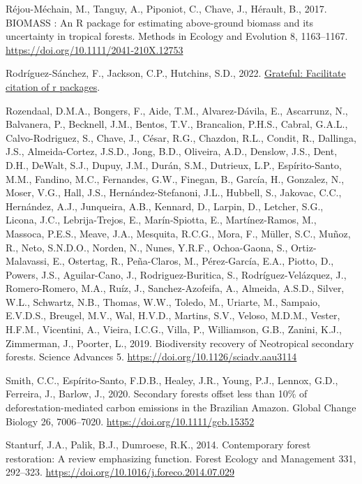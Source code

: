 \documentclass[
  12pt,
]{article}
\newlength{\cslhangindent}
\newlength{\cslentryspacingunit} %
\newenvironment{CSLReferences}[2] %
 {%
  \setlength{\parindent}{0pt}
  \ifodd #1
  \let\oldpar\par
  \def\par{\hangindent=\cslhangindent\oldpar}
  \fi
  \setlength{\parskip}{#2\cslentryspacingunit}
 }%
 {}
\begin{document}
\begin{CSLReferences}{1}{0}
\leavevmode{}%
Réjou-Méchain, M., Tanguy, A., Piponiot, C., Chave, J., Hérault, B., 2017. {BIOMASS} : An {R} package for estimating above-ground biomass and its uncertainty in tropical forests. Methods in Ecology and Evolution 8, 1163--1167. \url{https://doi.org/10.1111/2041-210X.12753}

\leavevmode{}%
Rodríguez-Sánchez, F., Jackson, C.P., Hutchins, S.D., 2022. \href{https://github.com/Pakillo/grateful}{Grateful: Facilitate citation of r packages}.

\leavevmode{}%
Rozendaal, D.M.A., Bongers, F., Aide, T.M., Alvarez-Dávila, E., Ascarrunz, N., Balvanera, P., Becknell, J.M., Bentos, T.V., Brancalion, P.H.S., Cabral, G.A.L., Calvo-Rodriguez, S., Chave, J., César, R.G., Chazdon, R.L., Condit, R., Dallinga, J.S., Almeida-Cortez, J.S.D., Jong, B.D., Oliveira, A.D., Denslow, J.S., Dent, D.H., DeWalt, S.J., Dupuy, J.M., Durán, S.M., Dutrieux, L.P., Espírito-Santo, M.M., Fandino, M.C., Fernandes, G.W., Finegan, B., García, H., Gonzalez, N., Moser, V.G., Hall, J.S., Hernández-Stefanoni, J.L., Hubbell, S., Jakovac, C.C., Hernández, A.J., Junqueira, A.B., Kennard, D., Larpin, D., Letcher, S.G., Licona, J.C., Lebrija-Trejos, E., Marín-Spiotta, E., Martínez-Ramos, M., Massoca, P.E.S., Meave, J.A., Mesquita, R.C.G., Mora, F., Müller, S.C., Muñoz, R., Neto, S.N.D.O., Norden, N., Nunes, Y.R.F., Ochoa-Gaona, S., Ortiz-Malavassi, E., Ostertag, R., Peña-Claros, M., Pérez-García, E.A., Piotto, D., Powers, J.S., Aguilar-Cano, J., Rodriguez-Buritica, S., Rodríguez-Velázquez, J., Romero-Romero, M.A., Ruíz, J., Sanchez-Azofeifa, A., Almeida, A.S.D., Silver, W.L., Schwartz, N.B., Thomas, W.W., Toledo, M., Uriarte, M., Sampaio, E.V.D.S., Breugel, M.V., Wal, H.V.D., Martins, S.V., Veloso, M.D.M., Vester, H.F.M., Vicentini, A., Vieira, I.C.G., Villa, P., Williamson, G.B., Zanini, K.J., Zimmerman, J., Poorter, L., 2019. Biodiversity recovery of {Neotropical} secondary forests. Science Advances 5. \url{https://doi.org/10.1126/sciadv.aau3114}

\leavevmode{}%
Smith, C.C., Espírito-Santo, F.D.B., Healey, J.R., Young, P.J., Lennox, G.D., Ferreira, J., Barlow, J., 2020. Secondary forests offset less than 10\% of deforestation-mediated carbon emissions in the {Brazilian Amazon}. Global Change Biology 26, 7006--7020. \url{https://doi.org/10.1111/gcb.15352}

\leavevmode{}%
Stanturf, J.A., Palik, B.J., Dumroese, R.K., 2014. Contemporary forest restoration: {A} review emphasizing function. Forest Ecology and Management 331, 292--323. \url{https://doi.org/10.1016/j.foreco.2014.07.029}


\end{CSLReferences}
\end{document}
